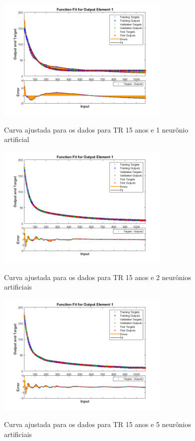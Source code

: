 \begin{figure}[h]
    \caption{Curva ajustada para os dados para TR 15 anos e 1 neurônio artificial}
    \centering
    \includegraphics[width=0.74\textwidth]{Textuais/Figuras/NN/tr15-1neuronio.png}
    \label{fig:tr15-1n}
\end{figure}

\begin{figure}[h]
    \caption{Curva ajustada para os dados para TR 15 anos e 2 neurônios artificiais}
    \centering
    \includegraphics[width=0.74\textwidth]{Textuais/Figuras/NN/tr15-2neuronio.png}
    \label{fig:tr15-2n}
\end{figure}

\begin{figure}[h]
    \caption{Curva ajustada para os dados para TR 15 anos e 5 neurônios artificiais}
    \centering
    \includegraphics[width=0.74\textwidth]{Textuais/Figuras/NN/tr15-5neuronio.png}
    \label{fig:tr15-5n}
\end{figure}

